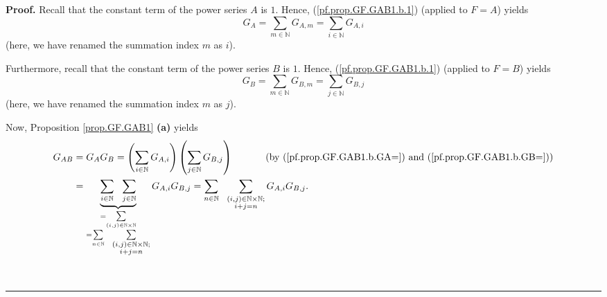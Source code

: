 \documentclass[numbers=enddot,12pt,final,onecolumn,notitlepage]{scrartcl}%
\theoremstyle{definition}
\newenvironment{proof}[1][Proof]{\noindent\textbf{#1.} }{\ \rule{0.5em}{0.5em}}
\let\sumnonlimits\sum
\renewcommand{\sum}{\sumnonlimits\limits}
\newenvironment{verlong}{}{}
\begin{document}
\begin{verlong}
\begin{proof}
Recall that the constant term of the power series $A$ is $1$. Hence,
(\ref{pf.prop.GF.GAB1.b.1}) (applied to $F=A$) yields%
\begin{equation}
G_{A}=\sum_{m\in\mathbb{N}}G_{A,m}=\sum_{i\in\mathbb{N}}G_{A,i}
\label{pf.prop.GF.GAB1.b.GA=}%
\end{equation}
(here, we have renamed the summation index $m$ as $i$).

Furthermore, recall that the constant term of the power series $B$ is $1$.
Hence, (\ref{pf.prop.GF.GAB1.b.1}) (applied to $F=B$) yields%
\begin{equation}
G_{B}=\sum_{m\in\mathbb{N}}G_{B,m}=\sum_{j\in\mathbb{N}}G_{B,j}
\label{pf.prop.GF.GAB1.b.GB=}%
\end{equation}
(here, we have renamed the summation index $m$ as $j$).

Now, Proposition \ref{prop.GF.GAB1} \textbf{(a)} yields
\begin{align}
G_{AB}  &  =G_{A}G_{B}=\left(  \sum_{i\in\mathbb{N}}G_{A,i}\right)  \left(
\sum_{j\in\mathbb{N}}G_{B,j}\right)  \ \ \ \ \ \ \ \ \ \ \left(  \text{by
(\ref{pf.prop.GF.GAB1.b.GA=}) and (\ref{pf.prop.GF.GAB1.b.GB=})}\right)
\nonumber\\
&  =\underbrace{\sum_{i\in\mathbb{N}}\ \ \sum_{j\in\mathbb{N}}}%
_{\substack{=\sum_{\left(  i,j\right)  \in\mathbb{N}\times\mathbb{N}}%
\\=\sum_{n\in\mathbb{N}}\ \ \sum_{\substack{\left(  i,j\right)  \in
\mathbb{N}\times\mathbb{N};\\i+j=n}}}}G_{A,i}G_{B,j}=\sum_{n\in\mathbb{N}%
}\ \ \sum_{\substack{\left(  i,j\right)  \in\mathbb{N}\times\mathbb{N}%
;\\i+j=n}}G_{A,i}G_{B,j}. \label{pf.prop.GF.GAB1.b.GAB=}%
\end{align}



\end{proof}
\end{verlong}
\end{document}
